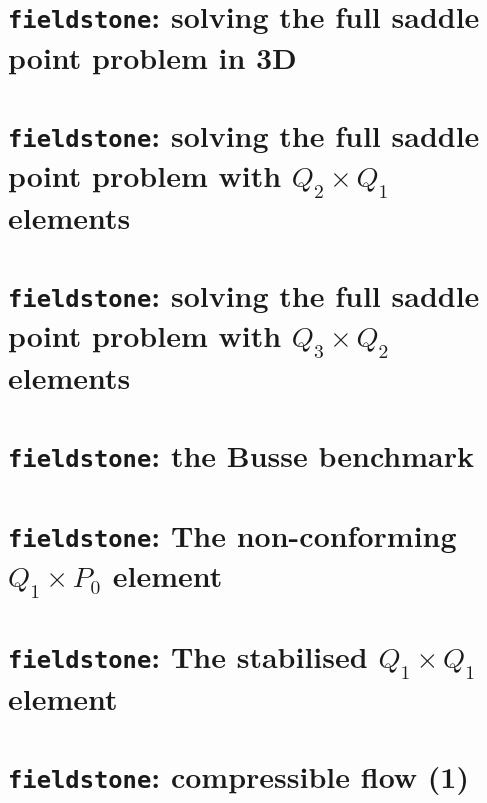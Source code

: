 \documentclass[a4paper]{article}
\begin{document}
\newpage
\section{{\tt fieldstone}: solving the full saddle point problem in 3D}


\newpage
\section{{\tt fieldstone}: solving the full saddle point problem with $Q_2\times Q_1$ elements}


\newpage
\section{{\tt fieldstone}: solving the full saddle point problem with $Q_3\times Q_2$ elements}


\newpage
\section{{\tt fieldstone}: the Busse benchmark}



\newpage
\section{{\tt fieldstone}: The non-conforming $Q_1 \times P_0$ element} 


\newpage
\section{{\tt fieldstone}: The stabilised $Q_1 \times Q_1$ element} 


\newpage
\section{{\tt fieldstone}: compressible flow (1)}

\end{document}

